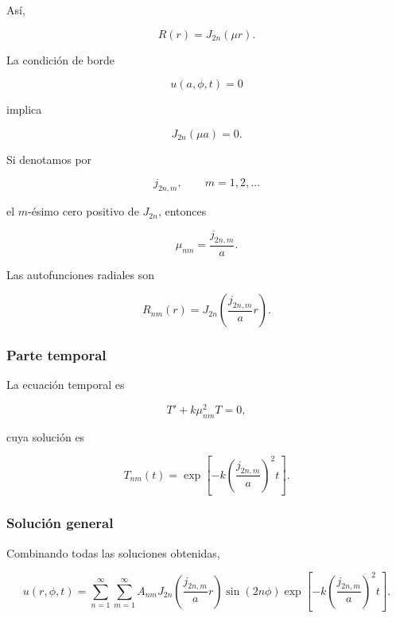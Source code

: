 \documentclass[12pt]{article}
\begin{document}
Así,

\begin{equation}
R(r)=J_{2n}(\mu r).
\end{equation}

La condición de borde

\[
u(a,\phi,t)=0
\]

implica

\begin{equation}
J_{2n}(\mu a)=0.
\end{equation}

Si denotamos por

\[
j_{2n,m},
\qquad
m=1,2,\ldots
\]

el $m$-ésimo cero positivo de $J_{2n}$, entonces

\begin{equation}
\mu_{nm}
=
\frac{j_{2n,m}}{a}.
\end{equation}

Las autofunciones radiales son

\begin{equation}
R_{nm}(r)
=
J_{2n}
\!\left(
\frac{j_{2n,m}}{a}r
\right).
\end{equation}

\subsubsection*{Parte temporal}

La ecuación temporal es

\begin{equation}
T'+k\mu_{nm}^2T=0,
\end{equation}

cuya solución es

\begin{equation}
T_{nm}(t)
=
\exp
\!\left[
-k
\left(
\frac{j_{2n,m}}{a}
\right)^2
t
\right].
\end{equation}

\subsubsection*{Solución general}

Combinando todas las soluciones obtenidas,

\begin{equation}
u(r,\phi,t)
=
\sum_{n=1}^{\infty}
\sum_{m=1}^{\infty}
A_{nm}
J_{2n}
\!\left(
\frac{j_{2n,m}}{a}r
\right)
\sin(2n\phi)
\exp
\!\left[
-k
\left(
\frac{j_{2n,m}}{a}
\right)^2
t
\right].
\end{equation}
\end{document}
